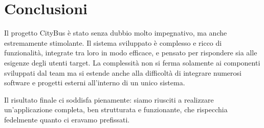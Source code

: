 \section{Conclusioni}

Il progetto CityBus è stato senza dubbio molto impegnativo, ma anche estremamente stimolante. Il sistema sviluppato è complesso e ricco di funzionalità, integrate tra loro in modo efficace, e pensato per rispondere sia alle esigenze degli utenti target.
La complessità non si ferma solamente ai componenti sviluppati dal team ma si estende anche alla difficoltà di integrare numerosi software e progetti esterni all'interno di un unico sistema.

Il risultato finale ci soddisfa pienamente: siamo riusciti a realizzare un’applicazione completa, ben strutturata e funzionante, che rispecchia fedelmente quanto ci eravamo prefissati.